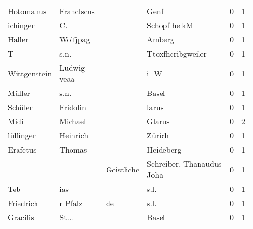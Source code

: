 \begin{tabular}{llllrr}
                Hotomanus &                         Franclscus &             &                                        Genf &          0 &         1 \\
                 ichinger &                                 C. &             &                                Schopf heikM &          0 &         1 \\
                   Haller &                           Wolfjpag &             &                                      Amberg &          0 &         1 \\
                        T &                               s.n. &             &                           Ttoxfhcribgweiler &          0 &         1 \\
             Wittgenstein &                        Ludwig veaa &             &                                        i. W &          0 &         1 \\
                   Müller &                               s.n. &             &                                       Basel &          0 &         1 \\
                  Schüler &                           Fridolin &             &                                       larus &          0 &         1 \\
                     Midi &                            Michael &             &                                      Glarus &          0 &         2 \\
                lüllinger &                           Heinrich &             &                                      Zürich &          0 &         1 \\
                 Erafctus &                             Thomas &             &                                   Heideberg &          0 &         1 \\
                          &                                    &  Geistliche &                   Schreiber. Thanaudus Joha &          0 &         1 \\
                      Teb &                                ias &             &                                        s.l. &          0 &         1 \\
                Friedrich &                            r Pfalz &          de &                                        s.l. &          0 &         1 \\
                 Gracilis &                              St... &             &                                       Basel &          0 &         1 \\

\end{tabular}
